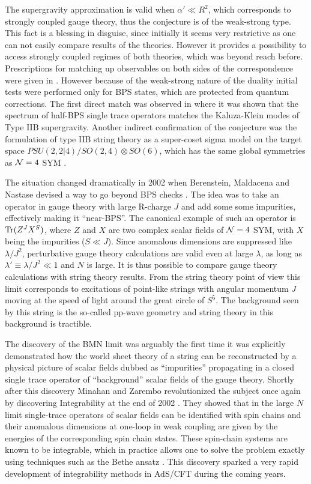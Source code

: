 The supergravity approximation is valid when $\alpha' \ll R^2$, which corresponds to strongly coupled gauge theory, thus the conjecture is of the weak-strong type. 
This fact is a blessing in disguise, since initially it seems very restrictive as one can not easily compare results of the theories. 
However it provides a possibility to access strongly coupled regimes of both theories, which was beyond reach before. 
Prescriptions for matching up observables on both sides of the correspondence were given in \cite{Gubser:1998bc, Witten:1998qj}. 
However because of the weak-strong nature of the duality initial tests were performed only for BPS states, which are protected from quantum corrections.
The first direct match was observed in \cite{Witten:1998qj} where it was shown that the spectrum of half-BPS single trace operators matches the Kaluza-Klein modes of Type IIB supergravity.
Another indirect confirmation of the conjecture was the formulation of type IIB string theory as a super-coset sigma model on the target space $PSU(2,2|4) / SO(2,4) \otimes SO(6)$, which has the same global symmetries as $\mathcal{N}=4$ SYM \cite{Metsaev:1998it}.

The situation changed dramatically in 2002 when Berenstein, Maldacena and Nastase devised a way to go beyond BPS checks \cite{Berenstein:2002jq}. 
The idea was to take an operator in gauge theory with large R-charge $J$ and add some some impurities, effectively making it ``near-BPS''.
The canonical example of such an operator is $\mathrm{Tr}(Z^J X^S)$, where $Z$ and $X$ are two complex scalar fields of $\mathcal{N}=4$ SYM, with $X$ being the impurities ($S \ll J$).
Since anomalous dimensions are suppressed like $\lambda/J^2$, perturbative gauge theory calculations are valid even at large $\lambda$, as long as $\lambda' \equiv \lambda / J^2 \ll 1$ and $N$ is large.
It is thus possible to compare gauge theory calculations with string theory results.
From the string theory point of view this limit corresponds to excitations of point-like strings with angular momentum $J$ moving at the speed of light around the great circle of $S^5$. 
The background seen by this string is the so-called pp-wave geometry and string theory in this background is tractible.

The discovery of the BMN limit was arguably the first time it was explicitly demonstrated how the world sheet theory of a string can be reconstructed by a physical picture of scalar fields dubbed as ``impurities'' propagating in a closed single trace operator of ``background'' scalar fields of the gauge theory. 
Shortly after this discovery Minahan and Zarembo revolutionized the subject once again by discovering Integrability at the end of 2002 \cite{Minahan:2002ve}.
They showed that in the large $N$ limit single-trace operators of scalar fields can be identified with spin chains and their anomalous dimensions at one-loop in weak coupling are given by the energies of the corresponding spin chain states.
These spin-chain systems are known to be integrable, which in practice allows one to solve the problem exactly using techniques such as the Bethe ansatz \cite{Bethe:1931}. 
This discovery sparked a very rapid development of integrability methods in AdS/CFT during the coming years.

